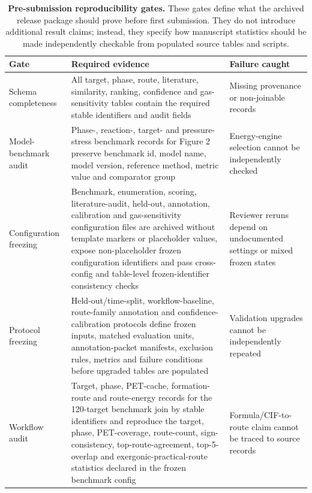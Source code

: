 \documentclass[11pt, letterpaper]{article}
\renewcommand{\arraystretch}{1.08}
\begin{document}
\begin{table}[p]
\centering
\tiny
\caption{\textbf{Pre-submission reproducibility gates.} These gates define what the archived release package should prove before first submission. They do not introduce additional result claims; instead, they specify how manuscript statistics should be made independently checkable from populated source tables and scripts.}
\begingroup
\setlength{\tabcolsep}{2pt}
\renewcommand{\arraystretch}{0.78}
\begin{tabular}{L{0.24\textwidth}L{0.44\textwidth}L{0.22\textwidth}}
\toprule
\textbf{Gate} & \textbf{Required evidence} & \textbf{Failure caught} \\
\midrule
Schema completeness & All target, phase, route, literature, similarity, ranking, confidence and gas-sensitivity tables contain the required stable identifiers and audit fields & Missing provenance or non-joinable records \\
Model-benchmark audit & Phase-, reaction-, target- and pressure-stress benchmark records for Figure 2 preserve benchmark id, model name, model version, reference method, metric value and comparator group & Energy-engine selection cannot be independently checked \\
Configuration freezing & Benchmark, enumeration, scoring, literature-audit, held-out, annotation, calibration and gas-sensitivity configuration files are archived without template markers or placeholder values, expose non-placeholder frozen configuration identifiers and pass cross-config and table-level frozen-identifier consistency checks & Reviewer reruns depend on undocumented settings or mixed frozen states \\
Protocol freezing & Held-out/time-split, workflow-baseline, route-family annotation and confidence-calibration protocols define frozen inputs, matched evaluation units, annotation-packet manifests, exclusion rules, metrics and failure conditions before upgraded tables are populated & Validation upgrades cannot be independently repeated \\
Workflow audit & Target, phase, PET-cache, formation-route and route-energy records for the 120-target benchmark join by stable identifiers and reproduce the target, phase, PET-coverage, route-count, sign-consistency, top-route-agreement, top-5-overlap and exergonic-practical-route statistics declared in the frozen benchmark config & Formula/CIF-to-route claim cannot be traced to source records \\

\end{tabular}
\end{table}
\end{document}
